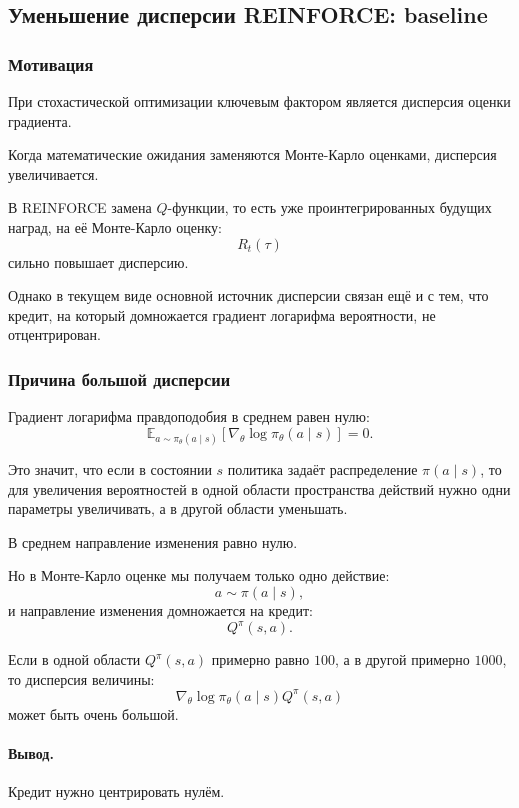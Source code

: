 \documentclass[12pt,a4paper]{article}
\begin{document}
\subsection{Уменьшение дисперсии REINFORCE: baseline}

\subsubsection{Мотивация}

При стохастической оптимизации ключевым фактором является дисперсия оценки градиента.

Когда математические ожидания заменяются Монте-Карло оценками, дисперсия увеличивается.

В REINFORCE замена $Q$-функции, то есть уже проинтегрированных будущих наград, на её Монте-Карло оценку:
\[
R_t(\tau)
\]
сильно повышает дисперсию.

Однако в текущем виде основной источник дисперсии связан ещё и с тем, что кредит, на который домножается градиент логарифма вероятности, не отцентрирован.

\subsubsection{Причина большой дисперсии}

Градиент логарифма правдоподобия в среднем равен нулю:
\[
\mathbb E_{a\sim\pi_\theta(a\mid s)}
\left[
\nabla_\theta
\log \pi_\theta(a\mid s)
\right]
=
0.
\]

Это значит, что если в состоянии $s$ политика задаёт распределение $\pi(a\mid s)$, то для увеличения вероятностей в одной области пространства действий нужно одни параметры увеличивать, а в другой области уменьшать.

В среднем направление изменения равно нулю.

Но в Монте-Карло оценке мы получаем только одно действие:
\[
a\sim\pi(a\mid s),
\]
и направление изменения домножается на кредит:
\[
Q^\pi(s,a).
\]

Если в одной области $Q^\pi(s,a)$ примерно равно $100$, а в другой примерно $1000$, то дисперсия величины:
\[
\nabla_\theta
\log \pi_\theta(a\mid s)
Q^\pi(s,a)
\]
может быть очень большой.

\paragraph{Вывод.}

Кредит нужно центрировать нулём.
\end{document}
